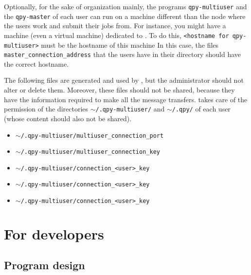 \documentclass[a4paper,12pt]{article}
\begin{document}
\begin{itemize}
  Optionally, for the sake of organization mainly, the programs \texttt{qpy-multiuser} and the \texttt{qpy-master} of each user can run on a machine different than the node where the users work and submit their jobs from.
  For instance, you might have a machine (even a virtual machine) dedicated to \qpy{}.
  To do this, \texttt{<hostname for qpy-multiuser>} must be the hostname of this machine
  In this case, the files \texttt{master\_connection\_address} that the users have in their \qpy{} directory should have the correct hostname.
  
\end{itemize}

The following files are generated and used by \qpy{}, but the administrator should not alter or delete them.
Moreover, these files should not be shared, because they have the information required to make all the message transfers.
\qpy{} takes care of the permission of the directories \texttt{$\sim$/.qpy-multiuser/} and \texttt{$\sim$/.qpy/} of each user (whose content should also not be shared).

\begin{itemize}
\item \texttt{$\sim$/.qpy-multiuser/multiuser\_connection\_port}
\item \texttt{$\sim$/.qpy-multiuser/multiuser\_connection\_key}
\item \texttt{$\sim$/.qpy-multiuser/connection\_<user>\_key}
\item \texttt{$\sim$/.qpy-multiuser/connection\_<user>\_key}
\item \texttt{$\sim$/.qpy-multiuser/connection\_<user>\_key}
\end{itemize}




\newpage
\section{For developers}



\subsection{Program design}

\linespread{0.8}
\end{document}
